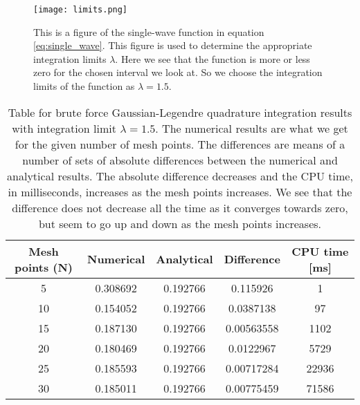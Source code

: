 \documentclass[12pt,a4paper,english]{article}
\begin{document}
\begin{figure}[htbp]
	\centering\texttt{[image: limits.png]}
	\caption{This is a figure of the single-wave function in equation \ref{eq:single_wave}. This figure is used to determine the appropriate integration limits $\lambda$. Here we see that the function is more or less zero for the chosen interval we look at. So we choose the integration limits of the function as $\lambda=1.5$. \label{fig:limits}}
\end{figure}

\begin{table}[htbp]
	\centering
	\begin{tabular}{ |c|c|c|c|c| }
		\hline \rule{0pt}{13pt}
		Mesh points (N) & Numerical & Analytical & Difference & CPU time [ms]\\
		\hline \rule{0pt}{13pt}
		5 & 0.308692 & 0.192766 & 0.115926 & 1 \\
		\hline \rule{0pt}{13pt}
		10 & 0.154052 & 0.192766 & 0.0387138 & 97 \\
		\hline \rule{0pt}{13pt}
		15 & 0.187130 & 0.192766 & 0.00563558 & 1102 \\
		\hline \rule{0pt}{13pt}
		20 & 0.180469 & 0.192766 & 0.0122967 & 5729 \\
		\hline \rule{0pt}{13pt}
		25 & 0.185593 & 0.192766 & 0.00717284 & 22936 \\
		\hline \rule{0pt}{13pt}
		30 & 0.185011 & 0.192766 & 0.00775459 & 71586 \\
		\hline 
	\end{tabular}	
	\caption{Table for brute force Gaussian-Legendre quadrature integration results with integration limit $\lambda=1.5$. The numerical results are what we get for the given number of mesh points. The differences are means of a number of sets of absolute differences between the numerical and analytical results. The absolute difference decreases and the CPU time, in milliseconds, increases as the mesh points increases. We see that the difference does not decrease all the time as it converges towards zero, but seem to go up and down as the mesh points increases.}
	\label{tab:Gauss_Leg}
\end{table}
\end{document}

